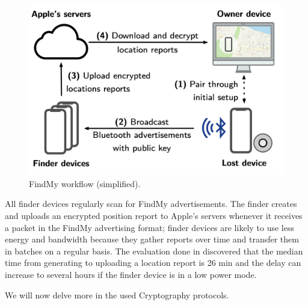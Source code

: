 \documentclass[english]{article}
\begin{document}
\begin{figure}[]
	\centering
	\includegraphics[width=.5\textwidth]{images/process.png}
	\caption{FindMy workflow (simplified).}
	\label{process}
\end{figure}
All finder devices regularly scan for FindMy advertisements.
The finder creates and uploads an encrypted position report to Apple's servers whenever it receives a packet in the FindMy advertising format; finder devices are likely to use less energy and bandwidth because they gather reports over time and transfer them in batches on a regular basis. The evaluation done in \cite{whocanfind} discovered that the median time from generating to uploading a location report is 26 min and the delay can increase to several hours if the finder device is in a low power mode.

We will now delve more in the used Cryptography protocols. 
\end{document}
